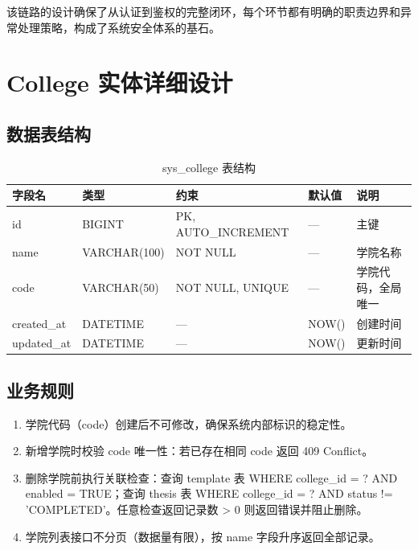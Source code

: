 \documentclass{../../softeng}
\begin{document}
该链路的设计确保了从认证到鉴权的完整闭环，每个环节都有明确的职责边界和异常处理策略，构成了系统安全体系的基石。

\section{College 实体详细设计}

\subsection{数据表结构}

\begin{table}[htbp]
\centering
\caption{sys\_college 表结构}
\begin{tabular}{lllll}
\toprule
\textbf{字段名} & \textbf{类型} & \textbf{约束} & \textbf{默认值} & \textbf{说明} \\
\midrule
id        & BIGINT  & PK, AUTO\_INCREMENT & —      & 主键 \\
name      & VARCHAR(100) & NOT NULL        & —      & 学院名称 \\
code      & VARCHAR(50)  & NOT NULL, UNIQUE & —      & 学院代码，全局唯一 \\
created\_at & DATETIME & —              & NOW()  & 创建时间 \\
updated\_at & DATETIME & —              & NOW()  & 更新时间 \\
\bottomrule
\end{tabular}
\end{table}

\subsection{业务规则}

\begin{enumerate}
    \item 学院代码（code）创建后不可修改，确保系统内部标识的稳定性。
    \item 新增学院时校验 code 唯一性：若已存在相同 code 返回 409 Conflict。
    \item 删除学院前执行关联检查：查询 template 表 WHERE college\_id = ? AND enabled = TRUE；查询 thesis 表 WHERE college\_id = ? AND status != 'COMPLETED'。任意检查返回记录数 > 0 则返回错误并阻止删除。
    \item 学院列表接口不分页（数据量有限），按 name 字段升序返回全部记录。
\end{enumerate}
\end{document}
